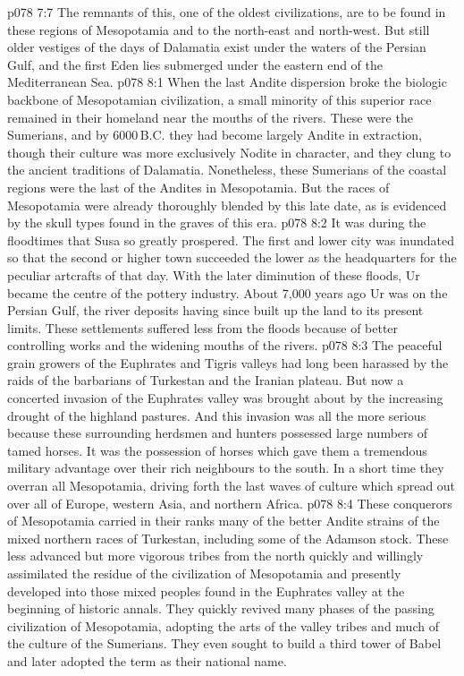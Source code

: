 \vs p078 7:7 The remnants of this, one of the oldest civilizations, are to be found in these regions of Mesopotamia and to the north\hyp{}east and north\hyp{}west. But still older vestiges of the days of Dalamatia exist under the waters of the Persian Gulf, and the first Eden lies submerged under the eastern end of the Mediterranean Sea.
\vs p078 8:1 When the last Andite dispersion broke the biologic backbone of Mesopotamian civilization, a small minority of this superior race remained in their homeland near the mouths of the rivers. These were the Sumerians, and by 6000\,B.C. they had become largely Andite in extraction, though their culture was more exclusively Nodite in character, and they clung to the ancient traditions of Dalamatia. Nonetheless, these Sumerians of the coastal regions were the last of the Andites in Mesopotamia. But the races of Mesopotamia were already thoroughly blended by this late date, as is evidenced by the skull types found in the graves of this era.
\vs p078 8:2 It was during the floodtimes that Susa so greatly prospered. The first and lower city was inundated so that the second or higher town succeeded the lower as the headquarters for the peculiar artcrafts of that day. With the later diminution of these floods, Ur became the centre of the pottery industry. About 7,000 years ago Ur was on the Persian Gulf, the river deposits having since built up the land to its present limits. These settlements suffered less from the floods because of better controlling works and the widening mouths of the rivers.
\vs p078 8:3 \pc The peaceful grain growers of the Euphrates and Tigris valleys had long been harassed by the raids of the barbarians of Turkestan and the Iranian plateau. But now a concerted invasion of the Euphrates valley was brought about by the increasing drought of the highland pastures. And this invasion was all the more serious because these surrounding herdsmen and hunters possessed large numbers of tamed horses. It was the possession of horses which gave them a tremendous military advantage over their rich neighbours to the south. In a short time they overran all Mesopotamia, driving forth the last waves of culture which spread out over all of Europe, western Asia, and northern Africa.
\vs p078 8:4 These conquerors of Mesopotamia carried in their ranks many of the better Andite strains of the mixed northern races of Turkestan, including some of the Adamson stock. These less advanced but more vigorous tribes from the north quickly and willingly assimilated the residue of the civilization of Mesopotamia and presently developed into those mixed peoples found in the Euphrates valley at the beginning of historic annals. They quickly revived many phases of the passing civilization of Mesopotamia, adopting the arts of the valley tribes and much of the culture of the Sumerians. They even sought to build a third tower of Babel and later adopted the term as their national name.
